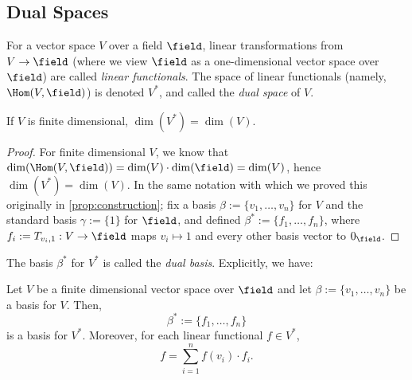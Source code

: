 \subsection{Dual Spaces}

\begin{definition}
For a vector space $V$ over a field $\field$, linear transformations from $V \to \field$ (where we view $\field$ as a one-dimensional vector space over $\field$) are called \emph{linear functionals}. The space of linear functionals (namely, $\Hom(V, \field)$) is denoted $V^\ast$, and called the \emph{dual space} of $V$.
\end{definition}

\begin{proposition}
    If $V$ is finite dimensional, $\dim(V^\ast) = \dim(V)$.\footnotemark
\end{proposition}
\begin{proof}
    For finite dimensional $V$, we know that $\dim(\Hom(V, \field)) = \dim(V) \cdot \dim(\field) = \dim(V)$, hence $\dim(V^*) = \dim(V)$. In the same notation with which we proved this originally in \cref{prop:construction}; fix a basis $\beta := \{v_1, \dots, v_n\}$ for $V$ and the standard basis $\gamma := \{1\}$ for $\field$, and defined $\beta^\ast := \{f_1, \dots, f_n\}$, where $f_i := T_{v_i, 1} : V \to \field$ maps $v_i \mapsto 1$ and every other basis vector to $0_\field$.
\end{proof}

\begin{remark}
The basis $\beta^\ast$ for $V^\ast$ is called the \emph{dual basis}. Explicitly, we have:
\end{remark}

\begin{corollary}
    Let $V$ be a finite dimensional vector space over $\field$ and let $\beta := \{v_1, \dots, v_n\}$ be a basis for $V$. Then,\[
    \beta^\ast := \{f_1, \dots, f_n\}    
    \]
    is a basis for $V^\ast$. Moreover, for each linear functional $f \in V^\ast$, \[    
    f = \sum_{i=1}^n f(v_i)\cdot f_i.
    \]
\end{corollary}

